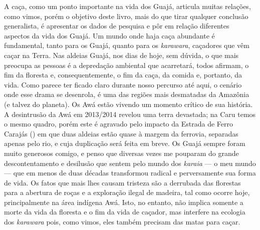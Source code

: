 A caça, como um ponto importante na vida dos Guajá, articula muitas
relações, como vimos, porém o objetivo deste livro, mais do que tirar
qualquer conclusão generalista, é apresentar os dados de pesquisa e pôr
em relação diferentes aspectos da vida dos Guajá. Um mundo onde haja
caça abundante é fundamental, tanto para os Guajá, quanto para os
\emph{karawara}, caçadores que vêm caçar na Terra. Nas aldeias Guajá,
nos dias de hoje, sem dúvida, o que mais preocupa as pessoas é a
depredação ambiental que acarretará, todos afirmam, o fim da floresta e,
consequentemente, o fim da caça, da comida e, portanto, da vida. Como
parece ter ficado claro durante nosso percurso até aqui, o cenário onde
esse drama se desenrola, é uma das regiões mais desmatadas da Amazônia
(e talvez do planeta). Os Awá estão vivendo um momento crítico de sua
história. A desintrusão da  Awá em 2013/2014 revelou uma terra
devastada; na  Caru temos o mesmo quadro, porém este é agravado pelo
impacto da Estrada de Ferro Carajás () em que duas aldeias estão
quase à margem da ferrovia, separadas apenas pelo rio, e cuja duplicação
será feita em breve. Os Guajá sempre foram muito generosos comigo, e
penso que diversas vezes me pouparam do grande descontentamento e
desilusão que sentem pelo mundo dos \emph{karaia} --- o meu mundo --- que em
menos de duas décadas transformou radical e perversamente sua forma de
vida. Os fatos que mais lhes causam tristeza são a derrubada das
florestas para a abertura de roças e a exploração ilegal de madeira, tal
como ocorre hoje, principalmente na área indígena Awá. Isto, no entanto,
não implica somente a morte da vida da floresta e o fim da vida de
caçador, mas interfere na ecologia dos \emph{karawara} pois, como vimos,
eles também precisam das matas para caçar.

